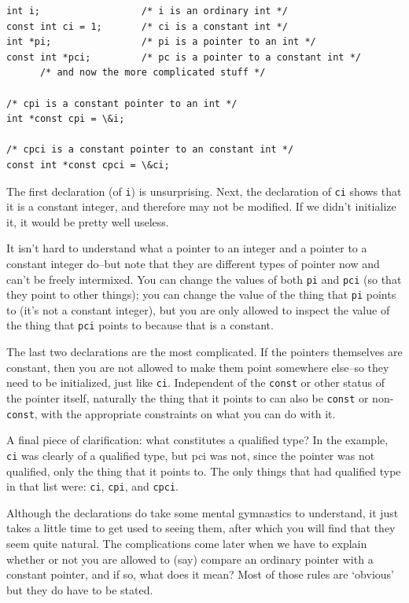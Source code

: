    \begin{Verbatim}
int i;                  /* i is an ordinary int */
const int ci = 1;       /* ci is a constant int */
int *pi;                /* pi is a pointer to an int */
const int *pci;         /* pc is a pointer to a constant int */
      /* and now the more complicated stuff */

/* cpi is a constant pointer to an int */
int *const cpi = \&i;

/* cpci is a constant pointer to an constant int */
const int *const cpci = \&ci;
\end{Verbatim}

   The first declaration (of \texttt{i}) is unsurprising. Next, the
    declaration of \texttt{ci} shows that it is a constant integer, and
    therefore may not be modified. If we didn't initialize it, it would be
    pretty well useless.


   It isn't hard to understand what a pointer to an integer and a pointer
    to a constant integer do--but note that they are different types of
    pointer now and can't be freely intermixed. You can change the values of
    both \texttt{pi} and \texttt{pci} (so that they point to other
    things); you can change the value of the thing that \texttt{pi}
    points to (it's not a constant integer), but you are only allowed to
    inspect the value of the thing that \texttt{pci} points to because
    that is a constant.


   The last two declarations are the most complicated. If the pointers
    themselves are constant, then you are not allowed to make them point
    somewhere else--so they need to be initialized, just like
    \texttt{ci}. Independent of the \texttt{const} or other status
    of the pointer itself, naturally the thing that it points to can also be
    \texttt{const} or non-\texttt{const}, with the appropriate
    constraints on what you can do with it.


   A final piece of clarification: what constitutes a qualified type? In
    the example, \texttt{ci} was clearly of a qualified type, but pci
    was not, since the pointer was not qualified, only the thing that it
    points to. The only things that had qualified type in that list were:
    \texttt{ci}, \texttt{cpi}, and \texttt{cpci}.


   Although the declarations do take some mental gymnastics to
    understand, it just takes a little time to get used to seeing them,
    after which you will find that they seem quite natural. The
    complications come later when we have to explain whether or not you are
    allowed to (say) compare an ordinary pointer with a constant pointer,
    and if so, what does it mean? Most of those rules are `obvious'
    but they do have to be stated.


